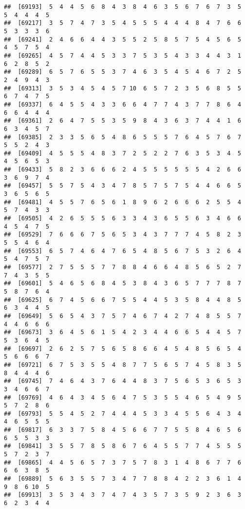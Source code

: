 \documentclass[
]{book}
\begin{document}
\begin{verbatim}
##  [69193]  5  4  4  5  6  8  4  3  8  4  6  3  5  6  7  6  7  3  5  5  4  4  4  5
##  [69217]  3  5  7  4  7  3  5  4  5  5  5  4  4  4  8  4  7  6  6  5  3  3  3  6
##  [69241]  2  4  6  6  4  4  3  5  5  2  5  8  5  7  5  4  5  6  5  4  5  7  5  4
##  [69265]  4  5  7  4  4  5  3  3  7  5  3  5  4  3  3  4  4  3  1  6  2  8  5  2
##  [69289]  6  5  7  6  5  5  3  7  4  6  3  5  4  5  4  6  7  2  5  2  4  9  4  3
##  [69313]  3  5  3  4  5  4  5  7 10  6  5  7  2  3  5  6  8  5  5  6  7  4  7  5
##  [69337]  6  4  5  5  4  3  3  6  6  4  7  7  4  3  7  7  8  6  4  6  6  4  4  4
##  [69361]  2  6  4  7  5  5  3  5  9  8  4  3  6  3  7  4  4  1  6  6  3  4  5  7
##  [69385]  2  3  3  5  6  5  4  8  6  5  5  5  7  6  4  5  7  6  7  5  5  2  4  3
##  [69409]  4  5  5  5  4  8  3  7  2  5  2  2  7  6  3  5  3  4  5  4  5  6  5  3
##  [69433]  5  8  2  3  6  6  6  2  4  5  5  5  5  5  5  4  2  6  6  3  6  9  7  4
##  [69457]  5  5  7  5  4  3  4  7  8  5  7  5  7  5  4  4  6  6  5  3  6  5  6  5
##  [69481]  4  5  5  7  6  5  6  1  8  9  6  2  6  6  6  2  5  5  4  5  7  4  3  3
##  [69505]  4  2  6  5  5  5  6  3  3  4  3  6  5  5  6  3  4  6  6  4  5  4  7  5
##  [69529]  7  6  6  6  7  5  6  5  3  4  3  7  7  7  4  5  8  2  3  5  5  4  6  4
##  [69553]  6  5  7  4  6  4  7  6  5  4  8  5  6  7  5  3  2  6  4  5  4  7  5  7
##  [69577]  2  7  5  5  5  7  7  8  8  4  6  6  4  8  5  6  5  2  7  7  4  3  5  5
##  [69601]  5  4  6  5  6  8  4  5  3  8  4  3  6  5  7  7  7  8  7  5  8  7  6  4
##  [69625]  6  7  4  5  6  6  7  5  5  4  4  5  3  5  8  4  4  8  5  6  3  4  4  5
##  [69649]  5  6  5  4  3  7  5  7  4  6  7  4  2  7  4  8  5  5  7  4  4  6  6  6
##  [69673]  3  6  4  5  6  1  5  4  2  3  4  4  6  6  5  4  4  5  7  5  3  6  4  5
##  [69697]  2  6  2  5  7  5  6  5  8  6  6  4  5  4  8  5  6  5  4  5  6  6  6  7
##  [69721]  6  7  5  3  5  5  4  8  7  7  5  6  5  7  4  5  8  3  5  8  4  4  4  6
##  [69745]  7  4  6  4  3  7  6  4  4  8  3  7  5  6  5  3  6  5  3  3  4  6  6  7
##  [69769]  4  6  4  3  4  5  6  4  7  5  3  5  5  4  6  5  4  9  5  5  7  2  8  6
##  [69793]  5  5  4  5  2  7  4  4  4  5  3  3  4  5  5  6  4  3  4  4  6  5  5  5
##  [69817]  6  3  3  7  5  8  4  5  6  6  7  7  5  5  8  4  6  5  6  6  5  5  3  3
##  [69841]  3  5  5  7  8  5  8  6  7  6  4  5  5  7  7  4  5  5  5  5  7  2  3  7
##  [69865]  4  4  5  6  5  7  3  7  5  7  8  3  1  4  8  6  7  7  6  6  6  3  8  5
##  [69889]  5  6  3  5  5  7  3  4  7  7  8  8  4  2  2  3  6  1  4  9  8  6 10  5
##  [69913]  3  5  3  4  3  7  4  7  4  3  5  7  3  5  9  2  3  6  3  6  2  3  4  4

\end{verbatim}
\end{document}
